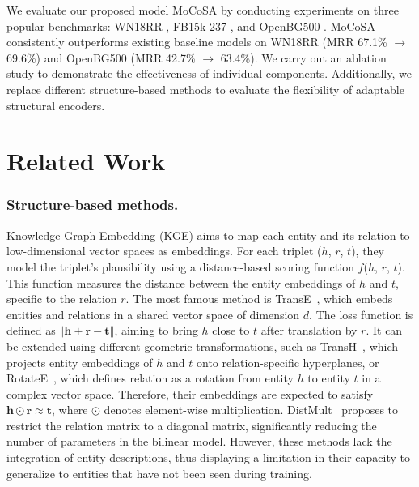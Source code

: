 \documentclass[11pt]{article}
\begin{document}
We evaluate our proposed model MoCoSA by conducting experiments on three popular benchmarks: WN18RR \cite{Dettmers2017Convolutional2K}, FB15k-237 \cite{Ma2015KnowledgeGI}, and OpenBG500 \cite{Deng2022ConstructionAA}. MoCoSA consistently outperforms existing baseline models on WN18RR (MRR 67.1\% $\rightarrow$ 69.6\%) and OpenBG500 (MRR 42.7\% $\rightarrow$ 63.4\%). We carry out an ablation study to demonstrate the effectiveness of individual components. Additionally, we replace different structure-based methods to evaluate the flexibility of adaptable structural encoders.

\section{Related Work}

\subsubsection{Structure-based methods.}

Knowledge Graph Embedding (KGE) aims to map each entity and its relation to low-dimensional vector spaces as embeddings. For each triplet ($h$, $r$, $t$), they model the triplet's plausibility using a distance-based scoring function $f$($h$, $r$, $t$). This function measures the distance between the entity embeddings of $h$ and $t$, specific to the relation $r$. The most famous method is TransE~\cite{bordes2013translating}, which embeds entities and relations in a shared vector space of dimension $d$. The loss function is defined as $\left\Vert \textbf{h}+\textbf{r}-\textbf{t} \right\Vert$, aiming to bring $h$ close to $t$ after translation by $r$. 
It can be extended using different geometric transformations, such as TransH~\cite{Wang2014KnowledgeGE}, which projects entity embeddings of $h$ and $t$ onto relation-specific hyperplanes, or RotateE~\cite{sun2018rotate}, which defines relation as a rotation from entity $h$ to entity $t$ in a complex vector space. Therefore, their embeddings are expected to satisfy $\textbf{h}\odot\textbf{r}\approx\textbf{t}$, where $\odot$ denotes element-wise multiplication. 
DistMult~\cite{yang2014embedding} proposes to restrict the relation matrix to a diagonal matrix, significantly reducing the number of parameters in the bilinear model. However, these methods lack the integration of entity descriptions, thus displaying a limitation in their capacity to generalize to entities that have not been seen during training.
\end{document}
